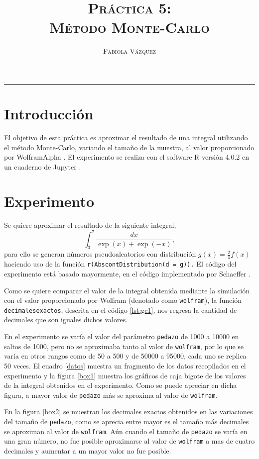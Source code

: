 \documentclass[12pt,letterpaper]{article}
\title{\textsc{Práctica 5: \\ Método Monte-Carlo}}
\author{\textsc{Fabiola Vázquez}}
\begin{document}
\maketitle

\hrule
\section{Introducción}
El objetivo de esta práctica \cite{elisapractica5} es aproximar el resultado de una integral utilizando el método Monte-Carlo, variando el tamaño de la muestra, al valor proporcionado por WolframAlpha \cite{wolfram}. El experimento se realiza con el software R versión 4.0.2 \cite{R} en un cuaderno de Jupyter \cite{jupyter}.

\section{Experimento}
Se quiere aproximar el resultado de la siguiente integral, 
\begin{equation}
\int_3^7 \frac{dx}{\exp(x) + \exp(-x)},
\end{equation}
para ello se generan números pseudoaleatorios con distribución $g(x)=\frac{2}{\pi}f(x)$ haciendo uso de la función \texttt{r(AbscontDistribution(d = g)).} El código del experimento \cite{fabiola} está basado mayormente, en el código implementado por Schaeffer \cite{codigoelisapractica5}. 

Como se quiere comparar el valor de la integral obtenida mediante la simulación con el valor proporcionado por Wolfram (denotado como \texttt{wolfram}), la función \texttt{decimalesexactos}, descrita en el código \ref{lst:gc1}, nos regresa la cantidad de decimales que son iguales dichos valores.

En el experimento se varía el valor del parámetro \texttt{pedazo} de 1000 a 10000 en saltos de 1000, pero no se aproximaba tanto al valor de \texttt{wolfram}, por lo que se varía en otros rangos como de 50 a 500 y de 50000 a 95000, cada uno se replica 50 veces. El cuadro \ref{datos} muestra un fragmento de los datos recopilados en el experimento y la figura \ref{box1} muestra los gráficos de caja bigote de los valores de la integral obtenidos en el experimento. Como se puede apreciar en dicha figura, a mayor valor de \texttt{pedazo} más se aproxima al valor de \texttt{wolfram}.

En la figura \ref{box2} se muestran los decimales exactos obtenidos en las variaciones del tamaño de \texttt{pedazo}, como se aprecia entre mayor es el tamaño más decimales se aproximan al valor de \texttt{wolfram}. Aún cuando el tamaño de \texttt{pedazo} se varía en una gran número, no fue posible aproximarse al valor de \texttt{wolfram} a mas de cuatro decimales y aumentar a un mayor valor no fue posible. 
 
\end{document}
